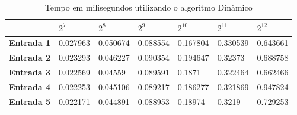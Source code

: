 \documentclass[
	12pt,				%
	oneside,   	        %
	a4paper,			%
	english,			%
	french,				%
	spanish,			%
	brazil,				%
	]{pacotes/abntex2}
\begin{document}
\begin{apendicesenv}
\begin{table}[!htb]
\centering
\caption{Tempo em milisegundos utilizando o algoritmo Dinâmico}
\label{tab:java16}
\footnotesize   %
\begin{tabular}{l|llllll}
\toprule
& \textbf{$2^7$} & \textbf{$2^8$} & \textbf{$2^9$} & \textbf{$2^{10}$} & \textbf{$2^{11}$} & \textbf{$2^{12}$}\\ 
\midrule
\textbf{Entrada 1} & 0.027963 &	0.050674 &	0.088554 &	0.167804 &	0.330539 &	0.643661\\
\textbf{Entrada 2} & 0.023293 &	0.046227 &	0.090354 &	0.194647 &	0.32373 &	0.688758\\
\textbf{Entrada 3} & 0.022569 &	0.04559 &	0.089591 &	0.1871 &	0.322464 &	0.662466\\
\textbf{Entrada 4} & 0.022253 &	0.045106 &	0.089217 &	0.186277 &	0.321869 &	0.947824\\
\textbf{Entrada 5} & 0.022171 &	0.044891 &	0.088953 &	0.18974 &	0.3219 &	0.729253\\
 \bottomrule
\end{tabular}
\end{table}


\end{apendicesenv}



\end{document}
